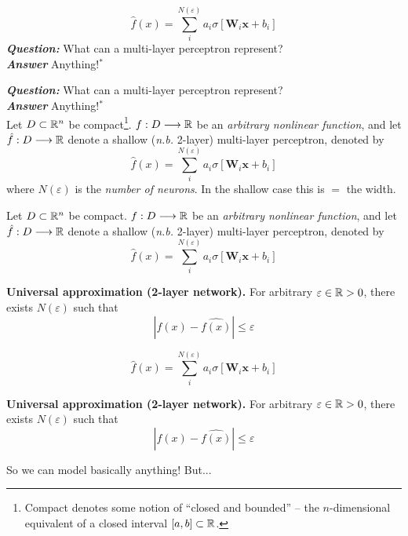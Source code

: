 \begin{frame}
    \[
        \hat{f}(x) =  \sum_i^{N(\varepsilon)} a_i \sigma \left[\mathbf{W}_i \mathbf{x} + b_i \right]
    \]
    \textbf{\textit{Question:}} What can a multi-layer perceptron represent? \\
    \textbf{\textit{Answer}} Anything!$^*$ \\
\end{frame}
\begin{frame}
    \textbf{\textit{Question:}} What can a multi-layer perceptron represent? \\
    \textbf{\textit{Answer}} Anything!$^*$ \\
    \vspace{1cm}
    Let $D \subset \mathbb{R}^n$ be compact\footnote{\tiny
        Compact denotes some notion of ``closed and bounded'' -- the $n$-dimensional
        equivalent of a closed interval $[a, b] \subset \mathbb{R}$.
    }.
    $f: D \longrightarrow \mathbb{R}$ be an \textit{arbitrary nonlinear function}, and let $\hat{f}: D \longrightarrow
    \mathbb{R}$ denote a shallow (\textit{n.b.} 2-layer) multi-layer perceptron, denoted by
    \[
        \hat{f}(x) =  \sum_i^{N(\varepsilon)} a_i \sigma \left[\mathbf{W}_i \mathbf{x} + b_i \right]
    \]
    where $N(\varepsilon)$ is the \textit{number of neurons}. In the shallow case this is $=$ 
    the width.
\end{frame}
\begin{frame}
    Let $D \subset \mathbb{R}^n$ be compact.
    $f: D \longrightarrow \mathbb{R}$ be an \textit{arbitrary nonlinear function}, and let $\hat{f}: D \longrightarrow
    \mathbb{R}$ denote a shallow (\textit{n.b.} 2-layer) multi-layer perceptron, denoted by
    \[
        \hat{f}(x) =  \sum_i^{N(\varepsilon)} a_i \sigma \left[\mathbf{W}_i \mathbf{x} + b_i \right]
    \]
    \begin{theorem}
        \textbf{Universal approximation (2-layer network).} For arbitrary $\varepsilon \in \mathbb{R} > 0$, there
        exists $N(\varepsilon)$ such that 
        \[
        |f(x) - \hat{f(x)}| \leq \varepsilon
        \]
    \end{theorem}
\end{frame}

\begin{frame}
    \[
        \hat{f}(x) =  \sum_i^{N(\varepsilon)} a_i \sigma \left[\mathbf{W}_i \mathbf{x} + b_i \right]
    \]
    \begin{theorem}
        \textbf{Universal approximation (2-layer network).} For arbitrary $\varepsilon \in \mathbb{R} > 0$, there
        exists $N(\varepsilon)$ such that 
        \[
        |f(x) - \hat{f(x)}| \leq \varepsilon
        \]
    \end{theorem}
    So we can model basically anything! But...
\end{frame}

